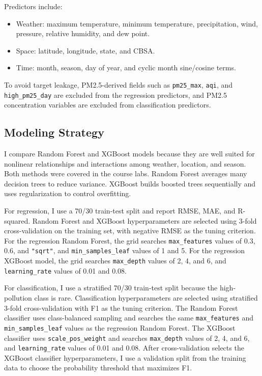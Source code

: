 \documentclass[
  letterpaper,
  DIV=11,
  numbers=noendperiod]{scrartcl}
\providecommand{\tightlist}{%
  \setlength{\itemsep}{0pt}\setlength{\parskip}{0pt}}
\begin{document}
Predictors include:

\begin{itemize}
\tightlist
\item
  Weather: maximum temperature, minimum temperature, precipitation,
  wind, pressure, relative humidity, and dew point.
\item
  Space: latitude, longitude, state, and CBSA.
\item
  Time: month, season, day of year, and cyclic month sine/cosine terms.
\end{itemize}

To avoid target leakage, PM2.5-derived fields such as
\texttt{pm25\_max}, \texttt{aqi}, and \texttt{high\_pm25\_day} are
excluded from the regression predictors, and PM2.5 concentration
variables are excluded from classification predictors.

\subsection{Modeling Strategy}\label{modeling-strategy}

I compare Random Forest and XGBoost models because they are well suited
for nonlinear relationships and interactions among weather, location,
and season. Both methods were covered in the course labs. Random Forest
averages many decision trees to reduce variance. XGBoost builds boosted
trees sequentially and uses regularization to control overfitting.

For regression, I use a 70/30 train-test split and report RMSE, MAE, and
R-squared. Random Forest and XGBoost hyperparameters are selected using
3-fold cross-validation on the training set, with negative RMSE as the
tuning criterion. For the regression Random Forest, the grid searches
\texttt{max\_features} values of 0.3, 0.6, and \texttt{"sqrt"}, and
\texttt{min\_samples\_leaf} values of 1 and 5. For the regression
XGBoost model, the grid searches \texttt{max\_depth} values of 2, 4, and
6, and \texttt{learning\_rate} values of 0.01 and 0.08.

For classification, I use a stratified 70/30 train-test split because
the high-pollution class is rare. Classification hyperparameters are
selected using stratified 3-fold cross-validation with F1 as the tuning
criterion. The Random Forest classifier uses class-balanced sampling and
searches the same \texttt{max\_features} and \texttt{min\_samples\_leaf}
values as the regression Random Forest. The XGBoost classifier uses
\texttt{scale\_pos\_weight} and searches \texttt{max\_depth} values of
2, 4, and 6, and \texttt{learning\_rate} values of 0.01 and 0.08. After
cross-validation selects the XGBoost classifier hyperparameters, I use a
validation split from the training data to choose the probability
threshold that maximizes F1.
\end{document}
